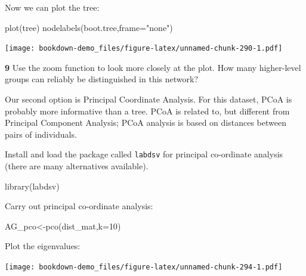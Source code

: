 \documentclass[
]{book}
\makeatletter
\newenvironment{Shaded}{\begin{snugshade}}{\end{snugshade}}
\newcommand{\AttributeTok}[1]{\textcolor[rgb]{0.77,0.63,0.00}{#1}}
\newcommand{\DecValTok}[1]{\textcolor[rgb]{0.00,0.00,0.81}{#1}}
\newcommand{\FunctionTok}[1]{\textcolor[rgb]{0.00,0.00,0.00}{#1}}
\newcommand{\NormalTok}[1]{#1}
\newcommand{\OtherTok}[1]{\textcolor[rgb]{0.56,0.35,0.01}{#1}}
\newcommand{\SpecialCharTok}[1]{\textcolor[rgb]{0.00,0.00,0.00}{#1}}
\newcommand{\StringTok}[1]{\textcolor[rgb]{0.31,0.60,0.02}{#1}}
\newenvironment{kframe}{%
\medskip{}
\setlength{\fboxsep}{.8em}
 \def\at@end@of@kframe{}%
 \ifinner\ifhmode%
  \def\at@end@of@kframe{\end{minipage}}%
  \begin{minipage}{\columnwidth}%
 \fi\fi%
 \def\FrameCommand##1{\hskip\@totalleftmargin \hskip-\fboxsep
 \colorbox{shadecolor}{##1}\hskip-\fboxsep
     \hskip-\linewidth \hskip-\@totalleftmargin \hskip\columnwidth}%
 \MakeFramed {\advance\hsize-\width
   \@totalleftmargin\z@ \linewidth\hsize
   \@setminipage}}%
 {\par\unskip\endMakeFramed%
 \at@end@of@kframe}
\newenvironment{rmdblock}[1]
  {
  \begin{itemize}
  \renewcommand{\labelitemi}{
    \raisebox{-.7\height}[0pt][0pt]{
      {\setkeys{Gin}{width=3em,keepaspectratio}\texttt{[image: images/\#1]}}
    }
  }
  \setlength{\fboxsep}{1em}
  \begin{kframe}
  \item
  }
  {
  \end{kframe}
  \end{itemize}
  }
\newenvironment{rmdquiz}
  {\begin{rmdblock}{quiz}}
  {\end{rmdblock}}
\makeatother
\begin{document}
Now we can plot the tree:

\begin{Shaded}
\begin{Highlighting}[]
\FunctionTok{plot}\NormalTok{(tree)}
\FunctionTok{nodelabels}\NormalTok{(boot.tree,}\AttributeTok{frame=}\StringTok{"none"}\NormalTok{)}
\end{Highlighting}
\end{Shaded}

\texttt{[image: bookdown-demo\_files/figure-latex/unnamed-chunk-290-1.pdf]}

\begin{rmdquiz}
\textbf{9} Use the zoom function to look more closely at the plot. How many higher-level groups can reliably be distinguished in this network?
\end{rmdquiz}

Our second option is Principal Coordinate Analysis. For this dataset, PCoA is probably more informative than a tree. PCoA is related to, but different from Principal Component Analysis; PCoA analysis is based on distances between pairs of individuals.

Install and load the package called \texttt{labdsv} for principal co-ordinate analysis (there are many alternatives available).

\begin{Shaded}
\begin{Highlighting}[]
\FunctionTok{library}\NormalTok{(labdsv)}
\end{Highlighting}
\end{Shaded}

Carry out principal co-ordinate analysis:

\begin{Shaded}
\begin{Highlighting}[]
\NormalTok{AG\_pco}\OtherTok{\textless{}{-}}\FunctionTok{pco}\NormalTok{(dist\_mat,}\AttributeTok{k=}\DecValTok{10}\NormalTok{)}
\end{Highlighting}
\end{Shaded}

Plot the eigenvalues:

\begin{Shaded}
\end{Shaded}

\texttt{[image: bookdown-demo\_files/figure-latex/unnamed-chunk-294-1.pdf]}
\end{document}
